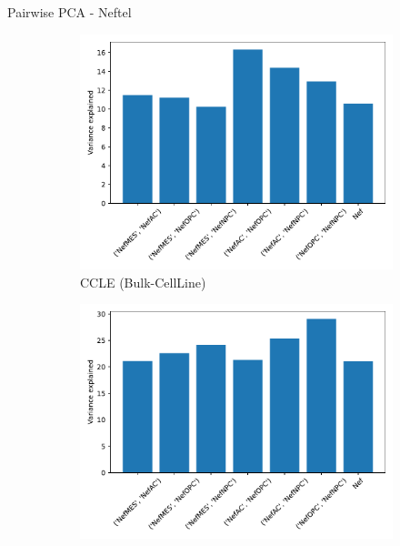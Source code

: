 \documentclass[aspectratio=169,9pt]{beamer}
\begin{document}
    \begin{frame}{Pairwise PCA - Neftel}
        \begin{adjustwidth}{-5cm}{-5cm}
            \centering
            \begin{figure}\ContinuedFloat
                \centering
                \begin{subfigure}[c]{0.38\textwidth}
                    \centering
                    \includegraphics[width=\textwidth]{CCLE_expvar_Nef}
                    \caption{CCLE (Bulk-CellLine)}
                \end{subfigure}
                \begin{subfigure}[c]{0.38\textwidth}
                    \centering
                    \includegraphics[width=\textwidth]{TCGA_expvar_Nef}

\end{subfigure}
\end{figure}
\end{adjustwidth}
\end{frame}
\end{document}

